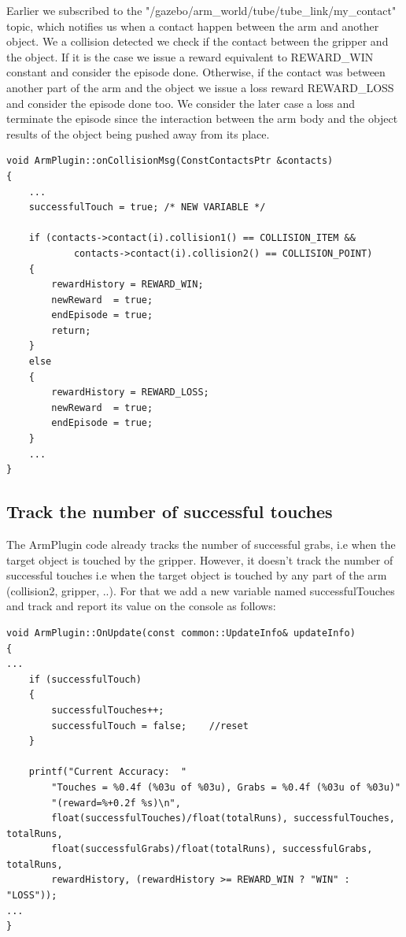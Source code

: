 \documentclass{article}
\begin{document}
Earlier we subscribed to the "/gazebo/arm\_world/tube/tube\_link/my\_contact" topic, which notifies us when a contact happen between the arm and another object. We a collision detected we check if the contact between the gripper and the object. If it is the case we issue a reward equivalent to REWARD\_WIN constant and consider the episode done. Otherwise, if the contact was between another part of the arm and the object we issue a loss reward REWARD\_LOSS and consider the episode done too. We consider the later case a loss and terminate the episode since the interaction between the arm body and the object results of the object being pushed away from its place.

\begin{lstlisting}
void ArmPlugin::onCollisionMsg(ConstContactsPtr &contacts)
{
    ...
    successfulTouch = true; /* NEW VARIABLE */

    if (contacts->contact(i).collision1() == COLLISION_ITEM &&
			contacts->contact(i).collision2() == COLLISION_POINT)
    {
        rewardHistory = REWARD_WIN;
        newReward  = true;
        endEpisode = true;
        return;
    }
    else
    {
        rewardHistory = REWARD_LOSS;
        newReward  = true;
        endEpisode = true;
    }
    ...
}
\end{lstlisting}

\subsection{Track the number of successful touches}
The ArmPlugin code already tracks the number of successful grabs, i.e when the target object is touched by the gripper. However, it doesn't track the number of successful touches i.e when the target object is touched by any part of the arm (collision2, gripper, ..). For that we add a new variable named successfulTouches and track and report its value on the console as follows:

\begin{lstlisting}
void ArmPlugin::OnUpdate(const common::UpdateInfo& updateInfo)
{
...
    if (successfulTouch)
    {
    	successfulTouches++;
    	successfulTouch = false;	//reset
    }
    
    printf("Current Accuracy:  "
        "Touches = %0.4f (%03u of %03u), Grabs = %0.4f (%03u of %03u)"
        "(reward=%+0.2f %s)\n",
    	float(successfulTouches)/float(totalRuns), successfulTouches, totalRuns,
    	float(successfulGrabs)/float(totalRuns), successfulGrabs, totalRuns,
    	rewardHistory, (rewardHistory >= REWARD_WIN ? "WIN" : "LOSS"));
...
}
\end{lstlisting}
\end{document}
